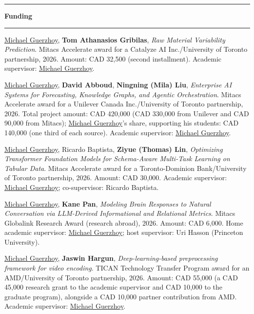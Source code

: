 \documentclass[letterpaper,11pt]{article}
\newcommand{\resheading}[1]{%
  \vspace{10pt}%
  \noindent\textcolor{accent}{\rule{3pt}{12pt}}\hspace{6pt}%
  {\large \textbf{\textcolor{accent}{#1}}}%
  \vspace{2pt}%
  \par\noindent\textcolor{accent!30}{\rule{\textwidth}{0.5pt}}%
  \vspace{2pt}%
}
\begin{document}
\resheading{Funding}

\begin{revnumerate}
	
	\item \underline{Michael Guerzhoy}, \textbf{Tom Athanasios Gribilas}, \textit{Raw Material Variability Prediction}. Mitacs Accelerate award for a Catalyze AI Inc./University of Toronto partnership, 2026. Amount: CAD 32,500 (second installment). Academic supervisor: \underline{Michael Guerzhoy}.

	\item \underline{Michael Guerzhoy}, \textbf{David Abboud}, \textbf{Ningning (Mila) Liu}, \textit{Enterprise AI Systems for Forecasting, Knowledge Graphs, and Agentic Orchestration}. Mitacs Accelerate award for a Unilever Canada Inc./University of Toronto partnership, 2026. Total project amount: CAD 420,000 (CAD 330,000 from Unilever and CAD 90,000 from Mitacs); \underline{Michael Guerzhoy}'s share, supporting his students: CAD 140,000 (one third of each source). Academic supervisor: \underline{Michael Guerzhoy}.

	\item \underline{Michael Guerzhoy}, Ricardo Baptista, \textbf{Ziyue (Thomas) Lin}, \textit{Optimizing Transformer Foundation Models for Schema-Aware Multi-Task Learning on Tabular Data}. Mitacs Accelerate award for a Toronto-Dominion Bank/University of Toronto partnership, 2026. Amount: CAD 30,000. Academic supervisor: \underline{Michael Guerzhoy}; co-supervisor: Ricardo Baptista.

	\item \underline{Michael Guerzhoy}, \textbf{Kane Pan}, \textit{Modeling Brain Responses to Natural Conversation via LLM-Derived Informational and Relational Metrics}. Mitacs Globalink Research Award (research abroad), 2026. Amount: CAD 6,000. Home academic supervisor: \underline{Michael Guerzhoy}; host supervisor: Uri Hasson (Princeton University).

	\item \underline{Michael Guerzhoy}, \textbf{Jaswin Hargun}, \textit{Deep-learning-based preprocessing framework for video encoding}. TICAN Technology Transfer Program award for an AMD/University of Toronto partnership, 2026. Amount: CAD 55,000 (a CAD 45,000 research grant to the academic supervisor and CAD 10,000 to the graduate program), alongside a CAD 10,000 partner contribution from AMD. Academic supervisor: \underline{Michael Guerzhoy}.


\end{revnumerate}
\end{document}
